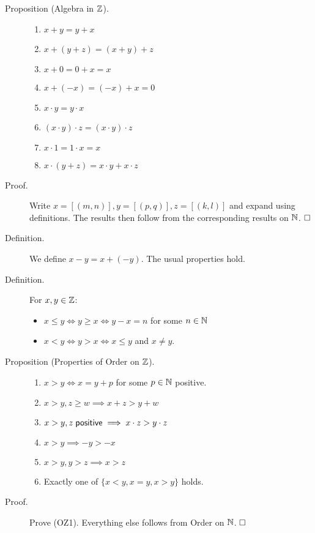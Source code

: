 \documentclass[letterpaper,11pt]{article}
\begin{document}
\begin{description}
\item[Proposition (Algebra in $\mathbb{Z}$).]\mbox{}
  \begin{multicols}{2}
  \begin{enumerate}[({A}Z1)]
  \item $x+y=y+x$
  \item $x+(y+z)=(x+y)+z$
  \item $x+0=0+x=x$
  \item $x+(-x)=(-x)+x=0$
  \item $x\cdot y = y\cdot x$
  \item $(x\cdot y)\cdot z = (x\cdot y)\cdot z$
  \item $x\cdot 1 = 1\cdot x = x$
  \item $x\cdot (y+z) = x\cdot y + x\cdot z$
  \end{enumerate}
  \end{multicols}
\item[Proof.] Write $x=[(m,n)], y=[(p,q)], z=[(k,l)]$ and expand
    using definitions. The results then follow from the corresponding
    results on $\mathbb{N}$. $\hfill\square$


\item[Definition.] We define $x-y = x+(-y)$. The usual properties hold.
\item[Definition.] For $x,y\in\mathbb{Z}$:
  \begin{itemize}
  \item $x\le y \iff y\ge x \iff y-x=n$ for some $n\in\mathbb{N}$
  \item $x<y \iff y>x \iff x\le y$ and $x\ne y$.
  \end{itemize}


\item[Proposition (Properties of Order on $\mathbb{Z}$).]\mbox{}
  \begin{enumerate}[(OZ1)]
  \item $x>y\iff x=y+p$ for some $p\in\mathbb{N}$ positive.
  \item $x>y,z\ge w\implies x+z>y+w$
  \item $x>y, z\;\mathsf{positive}\implies x\cdot z > y\cdot z$
  \item $x>y\implies -y > -x$
  \item $x > y, y>z\implies x>z$
  \item Exactly one of $\{x<y,x=y,x>y\}$ holds.
  \end{enumerate}
\item[Proof.] Prove (OZ1). Everything else follows from
    Order on $\mathbb{N}$. $\hfill\square$
\end{description}
\end{document}
